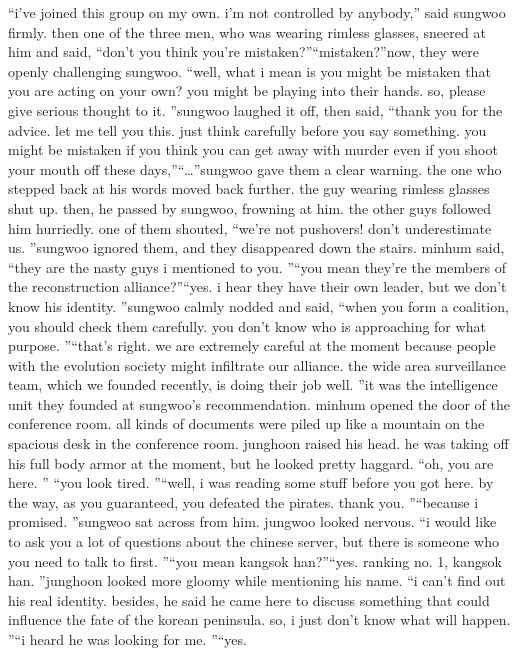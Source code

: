 “i’ve joined this group on my own.
 i’m not controlled by anybody,” said sungwoo firmly.
then one of the three men, who was wearing rimless glasses, sneered at him and said, “don’t you think you’re mistaken?”“mistaken?”now, they were openly challenging sungwoo.
“well, what i mean is you might be mistaken that you are acting on your own? you might be playing into their hands.
 so, please give serious thought to it.
”sungwoo laughed it off, then said, “thank you for the advice.
 let me tell you this.
 just think carefully before you say something.
 you might be mistaken if you think you can get away with murder even if you shoot your mouth off these days,”“…”sungwoo gave them a clear warning.
the one who stepped back at his words moved back further.
 the guy wearing rimless glasses shut up.
 then, he passed by sungwoo, frowning at him.
 the other guys followed him hurriedly.
one of them shouted, “we’re not pushovers! don’t underestimate us.
”sungwoo ignored them, and they disappeared down the stairs.
minhum said, “they are the nasty guys i mentioned to you.
”“you mean they’re the members of the reconstruction alliance?”“yes.
 i hear they have their own leader, but we don’t know his identity.
”sungwoo calmly nodded and said, “when you form a coalition, you should check them carefully.
 you don’t know who is approaching for what purpose.
”“that’s right.
 we are extremely careful at the moment because people with the evolution society might infiltrate our alliance.
 the wide area surveillance team, which we founded recently, is doing their job well.
”it was the intelligence unit they founded at sungwoo’s recommendation.
minhum opened the door of the conference room.
 all kinds of documents were piled up like a mountain on the spacious desk in the conference room.
junghoon raised his head.
 he was taking off his full body armor at the moment, but he looked pretty haggard.
“oh, you are here.
”
“you look tired.
”“well, i was reading some stuff before you got here.
 by the way, as you guaranteed, you defeated the pirates.
 thank you.
”“because i promised.
”sungwoo sat across from him.
 jungwoo looked nervous.
“i would like to ask you a lot of questions about the chinese server, but there is someone who you need to talk to first.
”“you mean kangsok han?”“yes.
 ranking no.
1, kangsok han.
”junghoon looked more gloomy while mentioning his name.
“i can’t find out his real identity.
 besides, he said he came here to discuss something that could influence the fate of the korean peninsula.
 so, i just don’t know what will happen.
”“i heard he was looking for me.
”“yes.
